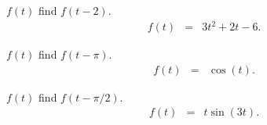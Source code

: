\begin{problem}
\begin{subproblem}
  \item $f(t)$ find $f(t-2)$.
    \begin{eqnarray}
      f(t) & = & 3t^2 + 2t - 6.
    \end{eqnarray}
    \vfill

  \item $f(t)$ find $f(t-\pi)$.
    \begin{eqnarray}
      f(t) & = & \cos(t).
    \end{eqnarray}
    \vfill

  \item $f(t)$ find $f(t-\pi/2)$.
    \begin{eqnarray}
      f(t) & = & t\sin(3t).
    \end{eqnarray}
    \vfill


  \end{subproblem}


\end{problem}


